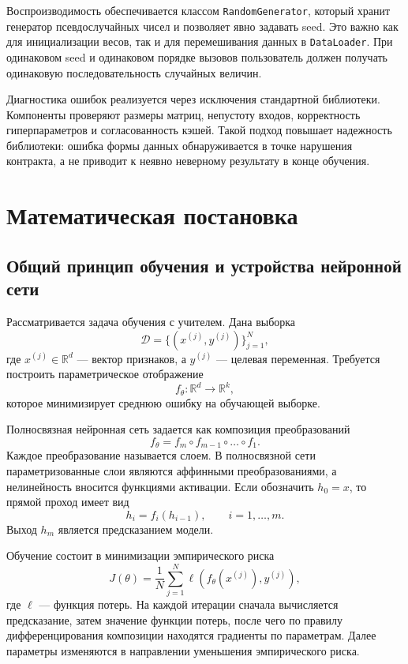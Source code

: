 \documentclass{article}
\begin{document}
Воспроизводимость обеспечивается классом \texttt{RandomGenerator},
который хранит генератор псевдослучайных чисел и позволяет явно
задавать seed. Это важно как для инициализации весов, так и для
перемешивания данных в \texttt{DataLoader}. При одинаковом seed и
одинаковом порядке вызовов пользователь должен получать одинаковую
последовательность случайных величин.

Диагностика ошибок реализуется через исключения стандартной
библиотеки. Компоненты проверяют размеры матриц, непустоту входов,
корректность гиперпараметров и согласованность кэшей. Такой подход
повышает надежность библиотеки: ошибка формы данных обнаруживается в
точке нарушения контракта, а не приводит к неявно неверному результату
в конце обучения.

\section{Математическая постановка}

\subsection{Общий принцип обучения и устройства нейронной сети}

Рассматривается задача обучения с учителем. Дана выборка
\[
    \mathcal{D} =
    \{(x^{(j)}, y^{(j)})\}_{j=1}^{N},
\]
где $x^{(j)} \in \mathbb{R}^{d}$ --- вектор признаков, а
$y^{(j)}$ --- целевая переменная. Требуется построить параметрическое
отображение
\[
    f_{\theta}: \mathbb{R}^{d} \to \mathbb{R}^{k},
\]
которое минимизирует среднюю ошибку на обучающей выборке.

Полносвязная нейронная сеть задается как композиция преобразований
\[
    f_{\theta}
    =
    f_m \circ f_{m-1} \circ \ldots \circ f_1.
\]
Каждое преобразование называется слоем. В полносвязной сети
параметризованные слои являются аффинными преобразованиями, а
нелинейность вносится функциями активации. Если обозначить
$h_0 = x$, то прямой проход имеет вид
\[
    h_i = f_i(h_{i-1}), \qquad i = 1,\ldots,m.
\]
Выход $h_m$ является предсказанием модели.

Обучение состоит в минимизации эмпирического риска
\[
    J(\theta)
    =
    \frac{1}{N}
    \sum_{j=1}^{N}
    \ell(f_{\theta}(x^{(j)}), y^{(j)}),
\]
где $\ell$ --- функция потерь. На каждой итерации сначала
вычисляется предсказание, затем значение функции потерь, после чего
по правилу дифференцирования композиции находятся градиенты по
параметрам. Далее параметры изменяются в направлении уменьшения
эмпирического риска.
\end{document}
